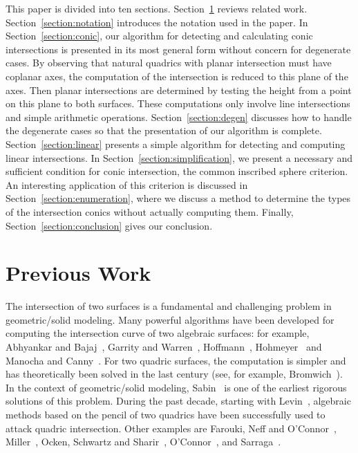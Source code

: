      This paper is divided into ten  sections.
Section~\ref{section:previous-work} reviews related work.
Section~\ref{section:notation} introduces the notation used in the paper.
In Section~\ref{section:conic}, our algorithm for detecting and
calculating conic intersections is presented in its most general form without
concern for degenerate cases.
By observing that natural quadrics with planar intersection must have coplanar
axes, the computation of the intersection is reduced to this plane of the axes.
Then planar intersections are determined by testing the height from a
point on this plane to both surfaces.
These computations only involve line intersections
and simple arithmetic operations.
Section~\ref{section:degen}
discusses how to handle the degenerate cases so that the presentation of our
algorithm is complete.
Section~\ref{section:linear} presents a simple algorithm for detecting
and computing linear intersections.
In Section~\ref{section:simplification}, we present a necessary and sufficient
condition for conic intersection, the common inscribed sphere criterion.
An interesting application of this criterion is discussed in
Section~\ref{section:enumeration}, where we discuss a method to determine
the types of the intersection conics without actually computing them.
Finally, Section~\ref{section:conclusion} gives our conclusion.


%

\section{Previous Work}
\label{section:previous-work}

     The intersection of two surfaces is a fundamental and challenging problem
in geometric/solid modeling.  Many powerful algorithms have been developed for
computing the intersection curve of two algebraic surfaces: for example,
Abhyankar and Bajaj~\cite{abhyankar-bajaj:1989},
Garrity and Warren~\cite{garrity-warren:1989},
Hoffmann~\cite{hoffmann:1989},
Hohmeyer~\cite{hohmeyer:1991} and
Manocha and Canny~\cite{manocha-canny:1991}.
For two quadric surfaces,
the computation is simpler and has theoretically been solved in the last
century (see, for example, Bromwich~\cite{bromwich:1971}).
In the context of geometric/solid modeling, Sabin~\cite{sabin:1976}
is one of the earliest rigorous solutions of this problem.
During the past decade, starting with Levin~\cite{levin:1976,levin:1979},
algebraic methods based on the pencil of two quadrics have been
successfully used to attack quadric intersection.  Other examples are
Farouki, Neff and O'Connor~\cite{farouki:1989}, Miller~\cite{miller:1987},
Ocken, Schwartz and Sharir~\cite{ocken:1987},
O'Connor~\cite{oconnor:1989},
and Sarraga~\cite{sarraga:1983}.

